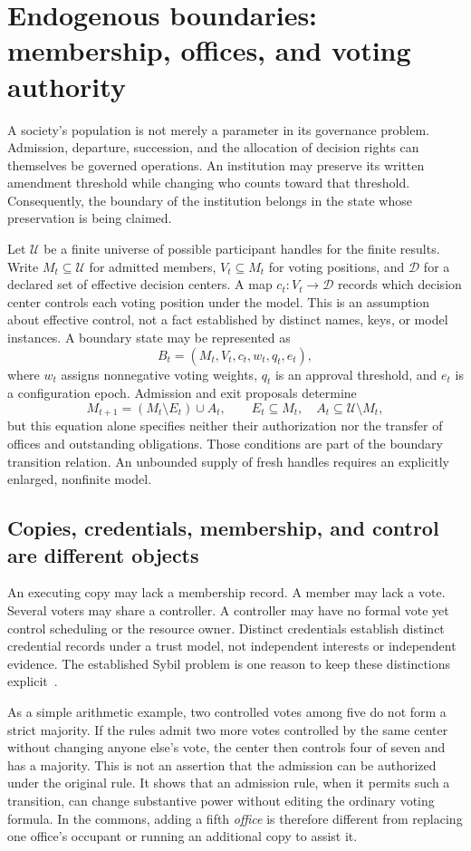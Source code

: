 \section{Endogenous boundaries: membership, offices, and voting authority}\label{MS:sec:membership}
A society's population is not merely a parameter in its governance problem. Admission, departure, succession, and the allocation of decision rights can themselves be governed operations. An institution may preserve its written amendment threshold while changing who counts toward that threshold. Consequently, the boundary of the institution belongs in the state whose preservation is being claimed.

Let $\mathcal U$ be a finite universe of possible participant handles for the finite results. Write $M_t\subseteq\mathcal U$ for admitted members, $V_t\subseteq M_t$ for voting positions, and $\mathcal D$ for a declared set of effective decision centers. A map $c_t:V_t\to\mathcal D$ records which decision center controls each voting position under the model. This is an assumption about effective control, not a fact established by distinct names, keys, or model instances. A boundary state may be represented as
\[
B_t=(M_t,V_t,c_t,w_t,q_t,e_t),
\]
where $w_t$ assigns nonnegative voting weights, $q_t$ is an approval threshold, and $e_t$ is a configuration epoch. Admission and exit proposals determine
\[
M_{t+1}=(M_t\setminus E_t)\cup A_t,
\qquad E_t\subseteq M_t,\quad A_t\subseteq\mathcal U\setminus M_t,
\]
but this equation alone specifies neither their authorization nor the transfer of offices and outstanding obligations. Those conditions are part of the boundary transition relation. An unbounded supply of fresh handles requires an explicitly enlarged, nonfinite model.

\subsection{Copies, credentials, membership, and control are different objects}
An executing copy may lack a membership record. A member may lack a vote. Several voters may share a controller. A controller may have no formal vote yet control scheduling or the resource owner. Distinct credentials establish distinct credential records under a trust model, not independent interests or independent evidence. The established Sybil problem is one reason to keep these distinctions explicit~\cite{MS:douceur}.

As a simple arithmetic example, two controlled votes among five do not form a strict majority. If the rules admit two more votes controlled by the same center without changing anyone else's vote, the center then controls four of seven and has a majority. This is not an assertion that the admission can be authorized under the original rule. It shows that an admission rule, when it permits such a transition, can change substantive power without editing the ordinary voting formula. In the commons, adding a fifth \emph{office} is therefore different from replacing one office's occupant or running an additional copy to assist it.

